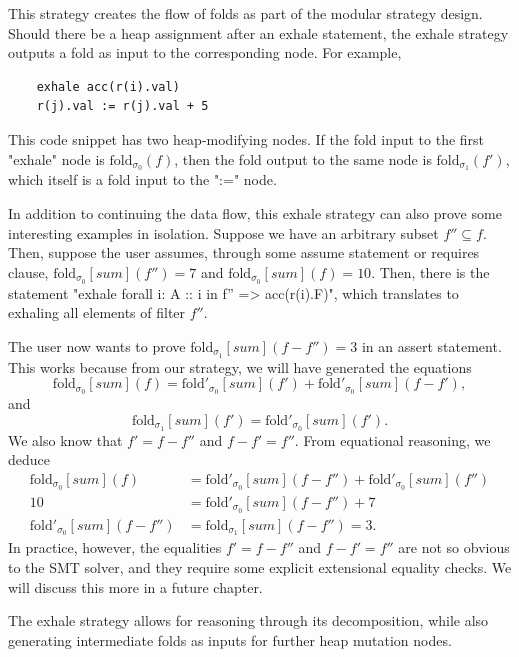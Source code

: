 \documentclass[msc,oneside]{ubcthesis}
\begin{document}
This strategy creates the flow of folds as part of the modular strategy design. Should there be a heap assignment after an exhale statement, the exhale strategy outputs a fold as input to the corresponding node. For example,
\begin{lstlisting}
    exhale acc(r(i).val)
    r(j).val := r(j).val + 5
\end{lstlisting}
This code snippet has two heap-modifying nodes. If the fold input to the first "exhale" node is $\textrm{fold}_{\sigma_0}(f)$, then the fold output to the same node is $\textrm{fold}_{\sigma_1}(f')$, which itself is a fold input to the ":=" node.

In addition to continuing the data flow, this exhale strategy can also prove some interesting examples in isolation. Suppose we have an arbitrary subset $f'' \subseteq f$. Then, suppose the user assumes, through some assume statement or requires clause, $\textrm{fold}_{\sigma_0}[\textit{sum}](f'') = 7$ and $\textrm{fold}_{\sigma_0}[\textit{sum}](f) = 10$. Then, there is the statement 
"exhale forall i: A :: i in f'' => acc(r(i).F)", which translates to exhaling all elements of filter $f''$. 

The user now wants to prove $\textrm{fold}_{\sigma_1}[\textit{sum}](f - f'') = 3$ in an assert statement. This works because from our strategy, we will have generated the equations
$$\textrm{fold}_{\sigma_0}[\textit{sum}](f) = \textrm{fold}'_{\sigma_0}[\textit{sum}](f') + \textrm{fold}'_{\sigma_0}[\textit{sum}](f - f'), $$ and
$$\textrm{fold}_{\sigma_1}[\textit{sum}](f') = \textrm{fold}'_{\sigma_0}[\textit{sum}](f'). $$
We also know that $f' = f - f''$ and $f - f' = f''$. From equational reasoning, we deduce
\begin{align*} 
\textrm{fold}_{\sigma_0}[\textit{sum}](f) &= \textrm{fold}'_{\sigma_0}[\textit{sum}](f - f'') + \textrm{fold}'_{\sigma_0}[\textit{sum}](f'') \\
10 &= \textrm{fold}'_{\sigma_0}[\textit{sum}](f - f'') + 7 \\
\textrm{fold}'_{\sigma_0}[\textit{sum}](f - f'') &= \textrm{fold}_{\sigma_1}[\textit{sum}](f - f'') = 3. 
\end{align*}
In practice, however, the equalities $f' = f - f''$ and $f - f' = f''$ are not so obvious to the SMT solver, and they require some explicit extensional equality checks. We will discuss this more in a future chapter.

The exhale strategy allows for reasoning through its decomposition, while also generating intermediate folds as inputs for further heap mutation nodes.
\end{document}
